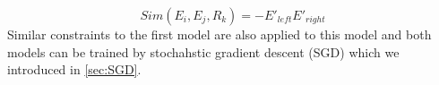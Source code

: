    \begin{equation}
    \label{eq:dot} Sim(E_{i}, E_{j}, R_{k}) = -E'_{left}E'_{right}
   \end{equation}
    Similar constraints to the first model are also applied to this model and 
     both models can be trained by stochahstic gradient descent (SGD) which we
     introduced in \autoref{sec:SGD}.



    